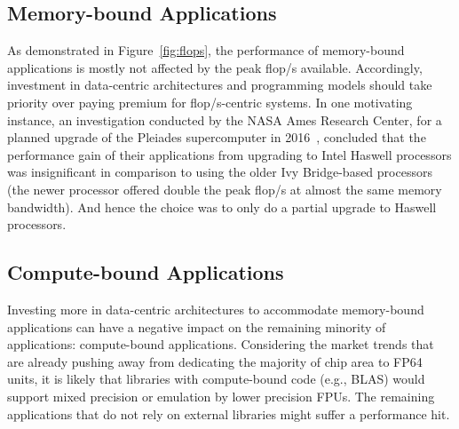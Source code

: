 \subsection{Memory-bound Applications}
As demonstrated in Figure~\ref{fig:flops}, the performance of memory-bound
applications is mostly not affected by the peak \unit[]{flop/s} available.
Accordingly, investment in data-centric architectures and programming models
should take priority over paying premium for \unit[]{flop/s}-centric systems.
In one motivating instance, an investigation conducted by the NASA Ames Research Center,
for a planned upgrade of the Pleiades supercomputer in 2016~\cite{saini_performance_2016},
concluded that the performance gain of their applications from upgrading to
Intel Haswell processors was insignificant in comparison to using the older
Ivy Bridge-based processors (the newer processor offered double the peak
\unit[]{flop/s} at almost the same memory bandwidth).
And hence the choice was to only do a partial upgrade to Haswell processors.

\subsection{Compute-bound Applications}
Investing more in data-centric architectures to accommodate memory-bound
applications can have a negative impact on the remaining minority of
applications: compute-bound applications. Considering the market trends that
are already pushing away from dedicating the majority of chip area to
FP64 units, it is likely that libraries with compute-bound code (e.g., BLAS)
would support mixed precision or emulation by lower precision FPUs. The
remaining applications that do not rely on external libraries might suffer a
performance hit.






